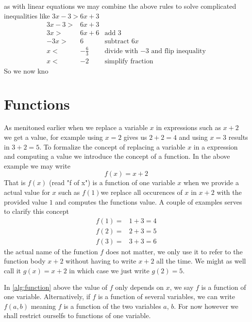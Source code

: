 as with linear equations we may combine the above rules to solve
complicated inequalities like $3x -3 > 6x + 3$
\begin{align*}
3x - 3 >& 6x + 3       &                                               \\
3x     >& 6x + 6       & \textrm{add $3$}                              \\
-3x    >& 6            & \textrm{subtract $6x$}                        \\
x      <& -\frac{6}{3} & \textrm{divide with $-3$ and flip inequality} \\
x      <& -2           & \textrm{simplify fraction}
\end{align*}
So we now kno

\section{Functions}
As menitoned earlier when we replace a variable $x$ in expressions such 
as $x+2$ we get a value, for example using $x=2$ gives us $2+2=4$ and 
using $x=3$ results in $3+2=5$. To formalize the concept of replacing a 
variable $x$ in a expression and computing a value we introduce the 
concept of a function. In the above example we may write 
\begin{equation}\label{alg:function}
f(x) = x + 2
\end{equation}
That is $f(x)$ (read "f of x") is a function of one variable $x$ when we 
provide a actual value for $x$ such as $f(1) $we replace all occurences 
of $x$ in $x+2$ with the provided value $1$ and computes the functions 
value. A couple of examples serves to clarify this concept
\begin{align*}
f(1) =& 1 + 3 = 4 \\
f(2) =& 2 + 3 = 5 \\
f(3) =& 3 + 3 = 6
\end{align*}
the actual name of the function $f$ does not matter, we only use it to 
refer to the function body $x+2$ without having to write $x+2$ all the 
time. We might as well call it $g(x) = x + 2$ in which case we just 
write $g(2) = 5$.

In \ref{alg:function} above the value of $f$ only depends on $x$, we 
say $f$ is a function of one variable. Alternatively, if $f$ is a 
function of several variables, we can write $f(a, b)$ meaning $f$ is 
a function of the two variables $a$, $b$. For now however we shall 
restrict ourselfs to functions of one variable. 

